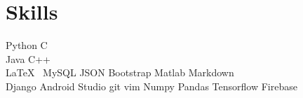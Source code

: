 
\section{Skills}
Python \textbullet{}   C \\
Java \textbullet{} C++ \\
\LaTeX\ \textbullet{} MySQL \textbullet{} JSON \textbullet{} Bootstrap \textbullet{} Matlab \textbullet{} Markdown \\

Django \textbullet{} Android Studio  \textbullet{} git \textbullet{} vim \textbullet{} Numpy \textbullet{} Pandas \textbullet{} Tensorflow \textbullet{} Firebase
\sectionsep